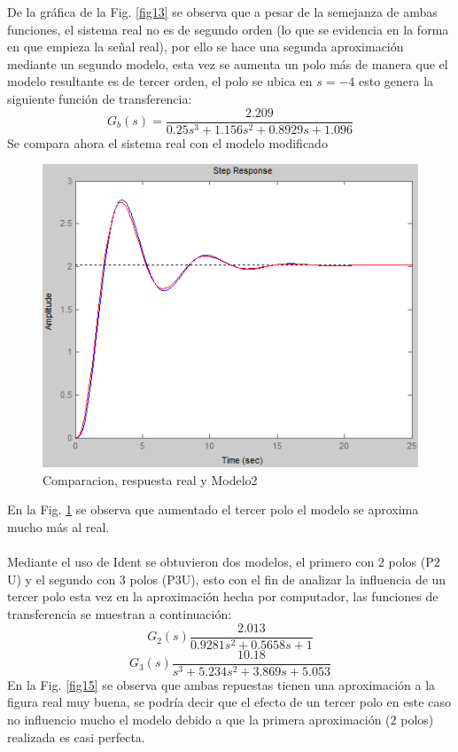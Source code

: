 \documentclass[twocolumn]{IEEEtran}
\begin{document}
De la gráfica de la Fig. \ref{fig13} se observa que a pesar de la semejanza de ambas funciones, el sistema real no es de segundo orden (lo que se evidencia en la forma en que empieza la señal real), por ello se hace una segunda aproximación mediante un segundo modelo, esta vez se aumenta un polo más de manera que el modelo resultante es de tercer orden, el polo se ubica en $s= - 4$ esto genera la siguiente función de transferencia:
$$G_b(s)=\frac{2.209}{0.25s^3+1.156s^2+0.8929s+1.096}$$
Se compara ahora el sistema real con el modelo modificado
\begin{figure}[]
	\centering
		\includegraphics[scale=0.5]{figure14.png}
	\caption{Comparacion, respuesta real y Modelo2}
	\label{fig14}
\end{figure}
\noindent
En la Fig. \ref{fig14} se observa que aumentado el tercer polo el modelo se aproxima mucho más al real.\\\\
Mediante el uso de Ident se obtuvieron dos modelos, el primero con $2$ polos (P$2$U) y el segundo con $3$ polos (P$3$U), esto con el fin de analizar la influencia de un tercer polo esta vez en la aproximación hecha por computador, las funciones de transferencia se muestran a continuación:
\begin{equation}
 G_2(s)\frac{2.013}{0.9281s^2+0.5658s+1}
\end{equation}
\begin{equation}
 G_3(s)\frac{10.18}{s^3+5.234s^2+3.869s+5.053}
\end{equation}
\noindent
En la Fig. \ref{fig15} se observa que ambas repuestas tienen una aproximación a la figura real muy buena, se podría decir que el efecto de un tercer polo en este caso no influencio mucho el modelo debido a que la primera aproximación ($2$ polos) realizada  es casi perfecta.
\end{document}
